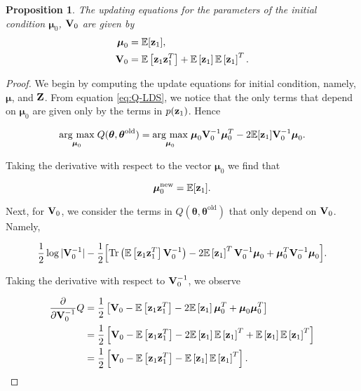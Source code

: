 \documentclass[11pt]{article}
\numberwithin{equation}{section}
\newcommand{\argmax}[1]{\underset{#1}{\operatorname{arg}\,\operatorname{max}}\;}
\newcommand{\expectation}[1]{\mathbb{E}\left[#1\right]}
\newcommand{\z}{{\bf z}}
\newtheorem{proposition}{Proposition}[section]
\begin{document}
\begin{proposition}
	The updating equations for the parameters of the initial condition $\boldsymbol{\mu}_0$, ${\bf V}_0$ are given by
	\begin{align}
		\boldsymbol{\mu}_0 &= \mathbb{E}[{\z_1}], \\
		{\bf V}_0 &= \expectation{\z_1 \z_1^T} + \expectation{\z_1}\expectation{\z_1}^T.
	\end{align}
\end{proposition}

\begin{proof}
	We begin by computing the update equations for initial condition, namely, $\boldsymbol\mu$, and $\bf Z$. From equation \eqref{eq:Q-LDS}, we notice that the only terms that depend on $\boldsymbol{\mu}_0$ are given only by the terms in $p(\z_1)$. Hence

\begin{align}
	\argmax{\boldsymbol{\mu}_0} Q(\boldsymbol\theta, \boldsymbol\theta^\text{old}) = \argmax{\boldsymbol{\mu}_0} \boldsymbol{\mu}_0 {\bf V}_0^{-1}\boldsymbol{\mu}_0^T -2\mathbb{E}[{\z_1}]{\bf V}_0^{-1}\boldsymbol{\mu}_0.
\end{align}

Taking the derivative with respect to the vector $\boldsymbol{\mu}_0$ we find that

\begin{equation}
	\boldsymbol{\mu}_0^\text{new} = \mathbb{E}[{\z_1}].
\end{equation}

Next, for ${\bf V}_0$, we consider the terms in $Q(\boldsymbol\theta, \boldsymbol\theta^\text{old})$ that only depend on ${\bf V}_0$. Namely,

\begin{equation}
	\frac{1}{2}\log \vert
	  {\bf V}_0^{-1}\vert -\frac{1}{2}\Big[\text{Tr}\left(\mathbb{E}\left[\z_1 \z_1^T\right] {\bf V}_0^{-1}\right) -2 \mathbb{E}\left[\z_1\right]^T{\bf V}_0^{-1}\boldsymbol\mu_0 + \boldsymbol\mu_0^T {\bf V}_0^{-1}\boldsymbol\mu_0\Big].
\end{equation}

Taking the derivative with respect to ${\bf V}_0^{-1}$, we observe

\begin{align}
	\frac{\partial}{\partial {\bf V}_0^{-1}} Q &= \frac{1}{2}\left[{\bf V}_0 - \expectation{\z_1 \z_1^T} - 2\expectation{\z_1}\boldsymbol{\mu}_0^T + \boldsymbol{\mu}_0 \boldsymbol{\mu}_0^T \right] \nonumber \\
	&= \frac{1}{2} \left[{\bf V}_0 - \expectation{\z_1 \z_1^T} - 2\expectation{\z_1}\expectation{\z_1}^T + \expectation{\z_1}\expectation{\z_1}^T \right] \nonumber \\
	&= \frac{1}{2}\left[{\bf V}_0 - \expectation{\z_1 \z_1^T} - \expectation{\z_1}\expectation{\z_1}^T\right].
\end{align}


\end{proof}
\end{document}
